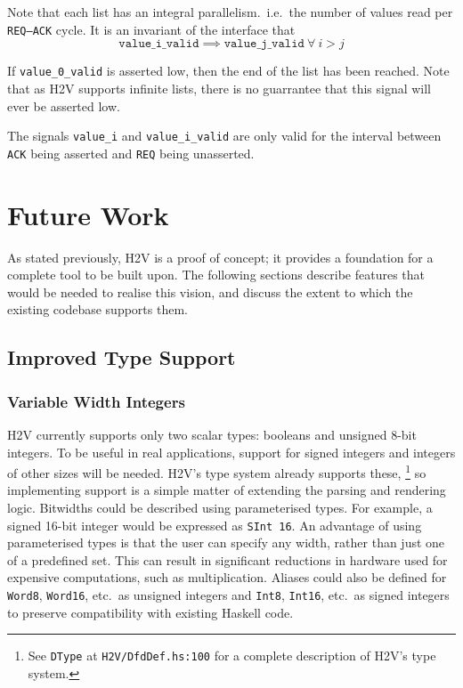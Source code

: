 \documentclass[english,onecolumn]{scrartcl}
\begin{document}
Note that each list has an integral parallelism.\ i.e.\ the number of values read per \texttt{REQ--ACK} cycle.
It is an invariant of the interface that
\[ \texttt{value\_i\_valid} \implies \texttt{value\_j\_valid}\ \forall\ i > j \]

If \texttt{value\_0\_valid} is asserted low, then the end of the list has been reached. Note that as H2V supports infinite lists,
there is no guarrantee that this signal will ever be asserted low.

The signals \texttt{value\_i} and \texttt{value\_i\_valid} are only valid
for the interval between \texttt{ACK} being asserted and \texttt{REQ} being unasserted.


\pagebreak{}
\section{Future Work}
As stated previously, H2V is a proof of concept; it provides a foundation for a complete tool to be built upon.
The following sections describe features that would be needed to realise this vision, and discuss the extent to which the existing
codebase supports them.

\subsection{Improved Type Support}
\subsubsection{Variable Width Integers}
H2V currently supports only two scalar types: booleans and unsigned 8-bit integers. To be useful in real applications,
support for signed integers and integers of other sizes will be needed. H2V's type system already supports these,%
\footnote{See \texttt{DType} at \texttt{H2V/DfdDef.hs:100} for a complete description of H2V's type system.}
so implementing support is a simple matter of extending the parsing and rendering logic.
Bitwidths could be described using parameterised types. For example, a signed 16-bit integer would be expressed as
\texttt{SInt 16}. An advantage of using parameterised types is that the user can specify any width, rather than just
one of a predefined set. This can result in significant reductions in hardware used for expensive computations, such as
multiplication. Aliases could also be defined for \texttt{Word8}, \texttt{Word16}, etc.\ as unsigned integers and \texttt{Int8},
\texttt{Int16}, etc.\ as signed integers to preserve compatibility with existing Haskell code.
\end{document}
